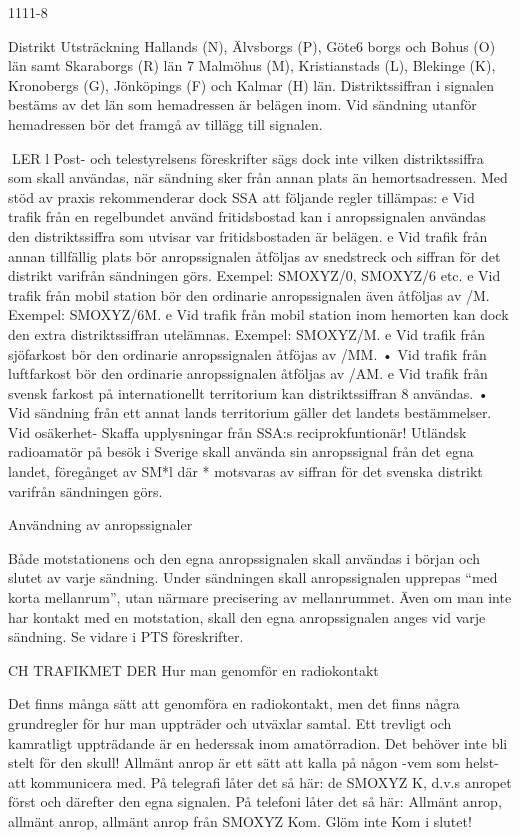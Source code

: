 1111-8

Distrikt Utsträckning
Hallands (N), Älvsborgs (P), Göte6
borgs och Bohus (O) län samt Skaraborgs (R) län
7
Malmöhus (M), Kristianstads (L),
Blekinge (K), Kronobergs (G),
Jönköpings (F) och Kalmar (H) län.
Distriktssiffran i signalen bestäms av det
län som hemadressen är belägen inom. Vid
sändning utanför hemadressen bör det
framgå av tillägg till signalen.

LER
l Post- och telestyrelsens föreskrifter sägs
dock inte vilken distriktssiffra som skall användas, när sändning sker från annan plats
än hemortsadressen.
Med stöd av praxis rekommenderar dock
SSA att följande regler tillämpas:
e
Vid trafik från en regelbundet använd
fritidsbostad kan i anropssignalen användas den distriktssiffra som utvisar var
fritidsbostaden är belägen.
e
Vid trafik från annan tillfällig plats bör
anropssignalen åtföljas av snedstreck och
siffran för det distrikt varifrån sändningen
görs.
Exempel: SMOXYZ/0, SMOXYZ/6 etc.
e
Vid trafik från mobil station bör den ordinarie anropssignalen även åtföljas av /M.
Exempel: SMOXYZ/6M.
e
Vid trafik från mobil station inom hemorten kan dock den extra distriktssiffran
utelämnas.
Exempel: SMOXYZ/M.
e
Vid trafik från sjöfarkost bör den ordinarie
anropssignalen åtföjas av /MM.
• Vid trafik från luftfarkost bör den ordinarie
anropssignalen åtföljas av /AM.
e
Vid trafik från svensk farkost på internationellt territorium kan distriktssiffran 8
användas.
• Vid sändning från ett annat lands territorium gäller det landets bestämmelser.
Vid osäkerhet- Skaffa upplysningar från
SSA:s reciprokfuntionär!
Utländsk radioamatör på besök i Sverige
skall använda sin anropssignal från det egna
landet, föregånget av SM*l där * motsvaras
av siffran för det svenska distrikt varifrån
sändningen görs.

Användning av anropssignaler

Både motstationens och den egna anropssignalen skall användas i början och slutet
av varje sändning.
Under sändningen skall anropssignalen
upprepas ``med korta mellanrum'', utan närmare precisering av mellanrummet.
Även om man inte har kontakt med en
motstation, skall den egna anropssignalen
anges vid varje sändning.
Se vidare i PTS föreskrifter.

CH TRAFIKMET DER
Hur man genomför en radiokontakt

Det finns många sätt att genomföra en radiokontakt, men det finns några grundregler för
hur man uppträder och utväxlar samtal. Ett
trevligt och kamratligt uppträdande är en
hederssak inom amatörradion. Det behöver
inte bli stelt för den skull!
Allmänt anrop är ett sätt att kalla på någon
-vem som helst- att kommunicera med.
På telegrafi låter det så här:
de SMOXYZ K, d.v.s anropet
först och därefter den egna signalen.
På telefoni låter det så här:
Allmänt anrop, allmänt anrop, allmänt anrop
från SMOXYZ Kom. Glöm inte Kom i slutet!

